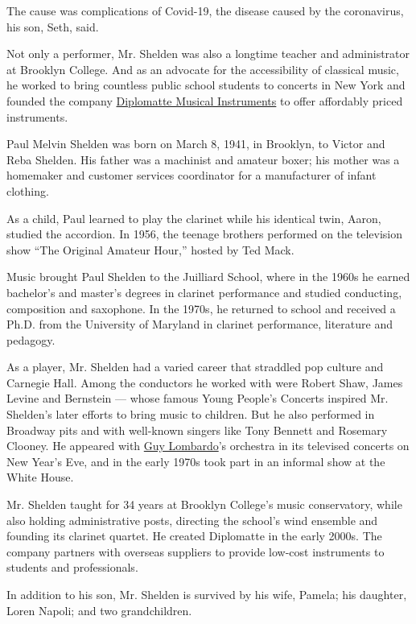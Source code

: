 The cause was complications of Covid-19, the disease caused by the
coronavirus, his son, Seth, said.

Not only a performer, Mr. Shelden was also a longtime teacher and
administrator at Brooklyn College. And as an advocate for the
accessibility of classical music, he worked to bring countless public
school students to concerts in New York and founded the company
\href{https://www.diplomattemusic.com/}{Diplomatte Musical Instruments}
to offer affordably priced instruments.

Paul Melvin Shelden was born on March 8, 1941, in Brooklyn, to Victor
and Reba Shelden. His father was a machinist and amateur boxer; his
mother was a homemaker and customer services coordinator for a
manufacturer of infant clothing.

As a child, Paul learned to play the clarinet while his identical twin,
Aaron, studied the accordion. In 1956, the teenage brothers performed on
the television show ``The Original Amateur Hour,'' hosted by Ted Mack.

Music brought Paul Shelden to the Juilliard School, where in the 1960s
he earned bachelor's and master's degrees in clarinet performance and
studied conducting, composition and saxophone. In the 1970s, he returned
to school and received a Ph.D. from the University of Maryland in
clarinet performance, literature and pedagogy.

As a player, Mr. Shelden had a varied career that straddled pop culture
and Carnegie Hall. Among the conductors he worked with were Robert Shaw,
James Levine and Bernstein --- whose famous Young People's Concerts
inspired Mr. Shelden's later efforts to bring music to children. But he
also performed in Broadway pits and with well-known singers like Tony
Bennett and Rosemary Clooney. He appeared with
\href{https://www.limusichalloffame.org/inductees/guy-lombardo/}{Guy
Lombardo}'s orchestra in its televised concerts on New Year's Eve, and
in the early 1970s took part in an informal show at the White House.

Mr. Shelden taught for 34 years at Brooklyn College's music
conservatory, while also holding administrative posts, directing the
school's wind ensemble and founding its clarinet quartet. He created
Diplomatte in the early 2000s. The company partners with overseas
suppliers to provide low-cost instruments to students and professionals.

In addition to his son, Mr. Shelden is survived by his wife, Pamela; his
daughter, Loren Napoli; and two grandchildren.

